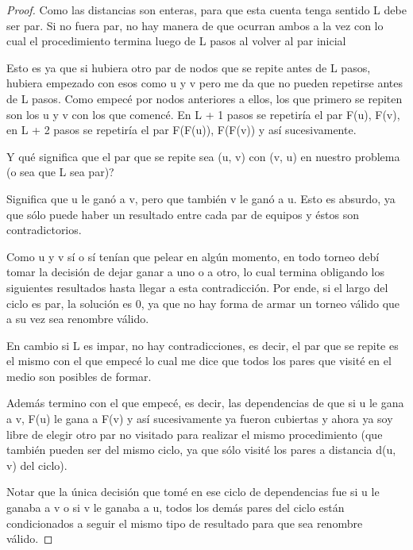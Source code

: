 \begin{proof}
	Como las distancias son enteras, para que esta cuenta tenga sentido L debe ser par. Si no fuera par, no hay manera de que ocurran ambos a la vez con lo cual el procedimiento termina luego de L pasos al volver al par inicial \newline

	Esto es ya que si hubiera otro par de nodos que se repite antes de L pasos, hubiera empezado con esos como u y v pero me da que no pueden repetirse antes de L pasos. Como empecé por nodos anteriores a ellos, los que primero se repiten son los u y v con los que comencé. En L + 1 pasos se repetiría el par F(u), F(v), en L + 2 pasos se repetiría el par F(F(u)), F(F(v)) y así sucesivamente. \newline
	
	Y qué significa que el par que se repite sea (u, v) con (v, u) en nuestro problema (o sea que L sea par)? \newline

	Significa que u le ganó a v, pero que también v le ganó a u. Esto es absurdo, ya que sólo puede haber un resultado entre cada par de equipos y éstos son contradictorios. \newline

	Como u y v sí o sí tenían que pelear en algún momento, en todo torneo debí tomar la decisión de dejar ganar a uno o a otro, lo cual termina obligando los siguientes resultados hasta llegar a esta contradicción. Por ende, si el largo del ciclo es par, la solución es 0, ya que no hay forma de armar un torneo válido que a su vez sea renombre válido. \newline

	En cambio si L es impar, no hay contradicciones, es decir, el par que se repite es el mismo con el que empecé lo cual me dice que todos los pares que visité en el medio son posibles de formar. \newline

	Además termino con el que empecé, es decir, las dependencias de que si u le gana a v, F(u) le gana a F(v) y así sucesivamente ya fueron cubiertas y ahora ya soy libre de elegir otro par no visitado para realizar el mismo procedimiento (que también pueden ser del mismo ciclo, ya que sólo visité los pares a distancia d(u, v) del ciclo). \newline

	Notar que la única decisión que tomé en ese ciclo de dependencias fue si u le ganaba a v o si v le ganaba a u, todos los demás pares del ciclo están condicionados a seguir el mismo tipo de resultado para que sea renombre válido. \newline


\end{proof}

